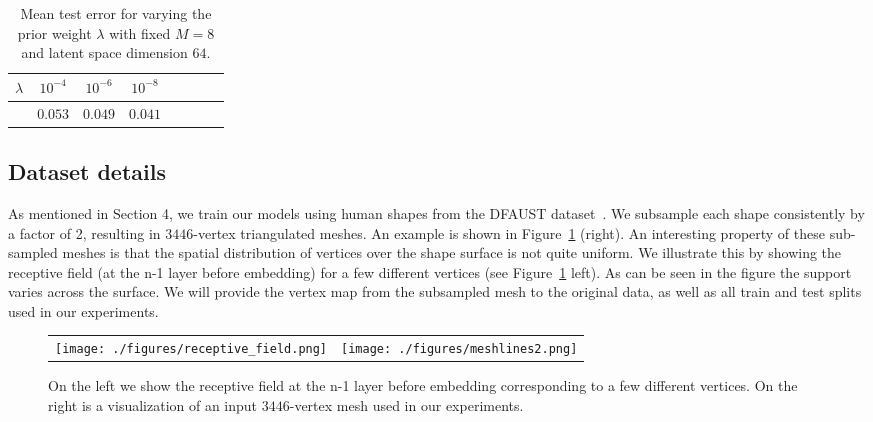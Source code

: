 \begin{table}[htb]
\centering
\small
\begin{tabular}{ l@{\hskip 0.01\textwidth}c@{\hskip 0.01\textwidth}c@{\hskip 0.01\textwidth}c@{\hskip 0.01\textwidth}c@{\hskip 0.01\textwidth}c@{\hskip 0.01\textwidth}c@{\hskip 0.01\textwidth}c  }
    \hline\hline
    $\lambda$ & $10^{-4}$ 	& $10^{-6}$ & $10^{-8}$ \\ \hline    
      	   & $0.053$ & $0.049$ & $ 0.041$ & \\ \hline
  \end{tabular}   
  \vspace{2mm}
\caption{\small Mean test error for varying the prior weight $\lambda$ with fixed $M=8$ and latent space dimension $64$.}
\label{tab_latent_loss_weight}	
\end{table}

\subsection{Dataset details}
As mentioned in Section 4, we train our models using human shapes from the DFAUST dataset~\cite{dfaust:CVPR:2017}. We subsample each shape consistently by a factor of 2, resulting in $3446$-vertex triangulated meshes. An example is shown in Figure~\ref{fig:receptive_field} (right). An interesting property of these sub-sampled meshes is that the spatial distribution of vertices over the shape surface is not quite uniform. We illustrate this by showing the receptive field (at the n-1 layer before embedding) for a few different vertices (see Figure~\ref{fig:receptive_field} left). As can be seen in the figure the support varies across the surface. We will provide the vertex map from the subsampled mesh to the original data, as well as all train and test splits used in our experiments.

\begin{figure}[h]
\centering
\begin{tabular}{cc}
\texttt{[image: ./figures/receptive\_field.png]} &
\texttt{[image: ./figures/meshlines2.png]}
\end{tabular}
\caption{On the left we show the receptive field at the n-1 layer before embedding corresponding to a few different vertices. On the right is a visualization of an input $3446$-vertex mesh used in our experiments.} 
\label{fig:receptive_field}
\end{figure}

